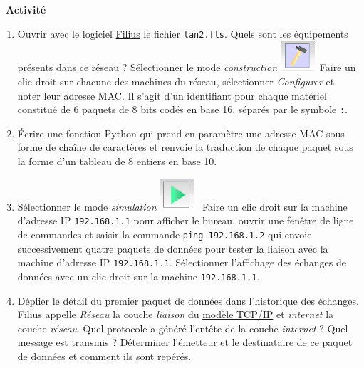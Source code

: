 \documentclass[
  11pt,
]{article}
\newcommand{\passthrough}[1]{#1}
\newcounter{activite}
\newenvironment{activite}[1]
{\par \medskip   \noindent   \addtocounter{activite}{1}
\begin{bclogo}[arrondi =0.1,   noborder = true, logo=\bcvelo, marge=4]{~\textbf{Activité} \textbf{\theactivite} {\itshape #1} }  \par}
{
\end{bclogo}
 \par \bigskip }
\newcounter{def}
\newcounter{logi}
\newcounter{histo}
\begin{document}
\begin{activite}{}

\begin{enumerate}
\def\labelenumi{\arabic{enumi}.}
\item
  Ouvrir avec le logiciel
  \href{https://www.lernsoftware-filius.de/Herunterladen}{Filius} le
  fichier \passthrough{\lstinline!lan2.fls!}. Quels sont les équipements
  présents dans ce réseau ? Sélectionner le mode \emph{construction}
  \includegraphics[width=0.1\textwidth,height=\textheight]{images/filius-construction.png}~Faire
  un clic droit sur chacune des machines du réseau, sélectionner
  \emph{Configurer} et noter leur adresse MAC. Il s'agit d'un
  identifiant pour chaque matériel constitué de 6 paquets de 8 bits
  codés en base 16, séparés par le symbole \passthrough{\lstinline!:!}.
\item
  Écrire une fonction Python qui prend en paramètre une adresse MAC sous
  forme de chaîne de caractères et renvoie la traduction de chaque
  paquet sous la forme d'un tableau de 8 entiers en base 10.
\item
  Sélectionner le mode \emph{simulation}
  \includegraphics[width=0.1\textwidth,height=\textheight]{images/filius-simulation.png}~
  Faire un clic droit sur la machine d'adresse IP
  \passthrough{\lstinline!192.168.1.1!} pour afficher le bureau, ouvrir
  une fenêtre de ligne de commandes et saisir la commande
  \passthrough{\lstinline!ping 192.168.1.2!} qui envoie successivement
  quatre paquets de données pour tester la liaison avec la machine
  d'adresse IP \passthrough{\lstinline!192.168.1.1!}. Sélectionner
  l'affichage des échanges de données avec un clic droit sur la machine
  \passthrough{\lstinline!192.168.1.1!}.
\item
  Déplier le détail du premier paquet de données dans l'historique des
  échanges. Filius appelle \emph{Réseau} la couche \emph{liaison} du
  \href{https://fr.wikipedia.org/wiki/Suite_des_protocoles_Internet}{modèle
  TCP/IP} et \emph{internet} la couche \emph{réseau}. Quel protocole a
  généré l'entête de la couche \emph{internet} ? Quel message est
  transmis ? Déterminer l'émetteur et le destinataire de ce paquet de
  données et comment ils sont repérés.
\end{enumerate}


\end{activite}
\end{document}
